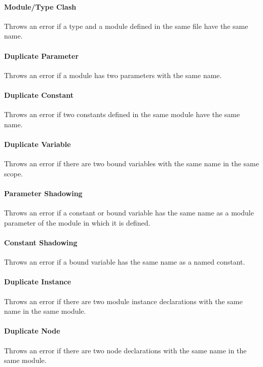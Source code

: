 \documentclass[a4paper,11pt,twoside]{report}
\begin{document}
{{{\paragraph{Module/Type Clash}
Throws an error if a type and a module defined in the same file have the same name.

\paragraph{Duplicate Parameter}
Throws an error if a module has two parameters with the same name.

\paragraph{Duplicate Constant}
Throws an error if two constants defined in the same module have the same name.

\paragraph{Duplicate Variable}
Throws an error if there are two bound variables with the same name in the same scope.

\paragraph{Parameter Shadowing}
Throws an error if a constant or bound variable has the same name as a module parameter of the module in which it is defined.

\paragraph{Constant Shadowing}
Throws an error if a bound variable has the same name as a named constant.

\paragraph{Duplicate Instance}
Throws an error if there are two module instance declarations with the same name in the same module.

\paragraph{Duplicate Node}
Throws an error if there are two node declarations with the same name in the same module.

}}}
\end{document}

